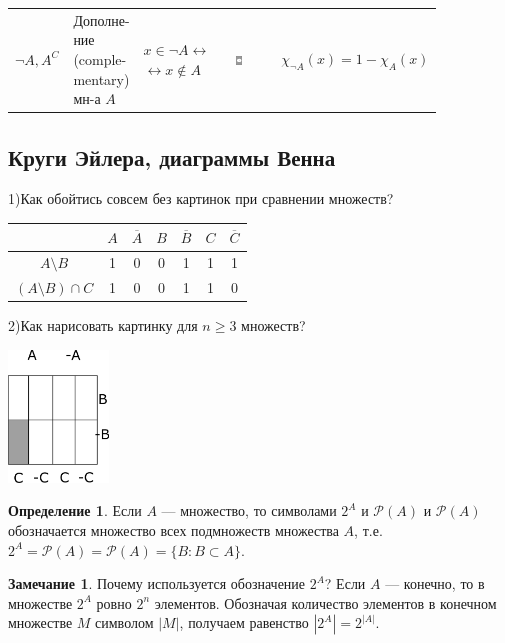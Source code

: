 \documentclass[12pt,oneside]{article}
\theoremstyle{definition}
\newtheorem{definition}{Определение}
\newtheorem{remark}{Замечание}[section]
\begin{document}
\begin{table}[H]
\begin{tabular}{p{0.1\linewidth}| p{0.1\linewidth}| p{0.25\linewidth}| p{0.2\linewidth}| p{0.2\linewidth}}
         $\neg A, A^C$ &
         Дополне-ние (comple-mentary) мн-а $A$ &
         $x\in \neg A \leftrightarrow$ \newline $\leftrightarrow x\not \in A$ &
         \includegraphics[width=0.2\textwidth]{dop.eps}
         &
         $\chi_{\neg A}(x)= 1 - \chi_{A}(x)$
    \end{tabular}
    \label{tab:my_label}
\end{table}

\subsection{Круги Эйлера, диаграммы Венна}
1)Как обойтись совсем без картинок при сравнении множеств?
\newline
\begin{tabular}{c|c|c|c|c|c|c}
         & $A$ & $\overline{A}$ & $B$ & $\overline{B}$ & $C$ & $\overline{C}$ \\\hline
         $A\setminus B$ &1&0&0&1&1&1\\\hline
         $(A\setminus B)\cap C$&1&0&0&1&1&0\\
\end{tabular}

2)Как нарисовать картинку для $n\geqslant 3$ множеств? 

\includegraphics[width=0.2\textwidth]{ris.eps}

\begin{definition}
Если $A$ --- множество, то символами $2^A$ и $\mathcal{P}(A)$ и $\mathscr{P}(A)$ обозначается множество всех подмножеств множества $A$, т.е. $2^A = \mathcal{P}(A) = \mathscr{P}(A) = \{B: B\subset A\}$.
\end{definition}

\begin{remark}
Почему используется обозначение $2^A$? Если $A$ --- конечно, то в множестве $2^A$ ровно $2^n$ элементов. Обозначая количество элементов в конечном множестве $M$ символом $|M|$, получаем равенство $\left|2^A\right|=2^{|A|}$.
\end{remark}
\end{document}
